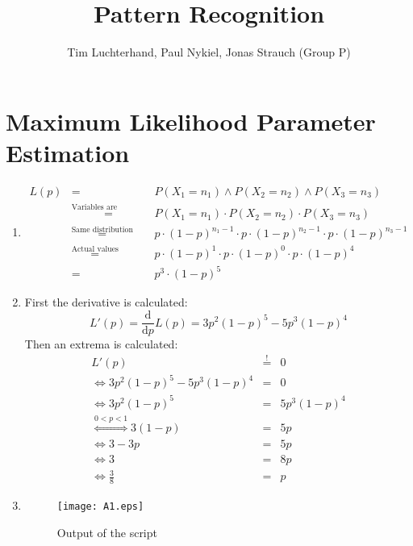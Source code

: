 \documentclass[DIN, pagenumber=false, fontsize=11pt, parskip=half]{scrartcl}
\title{Pattern Recognition}
\author{Tim Luchterhand, Paul Nykiel, Jonas Strauch (Group P)}
\begin{document}
    \maketitle
    \section{Maximum Likelihood Parameter Estimation}
    \begin{enumerate}
        \item
            \begin{eqnarray*}
                L(p) &=& P({X_1 = n_1}) \land P({X_2 = n_2}) \land P({X_3 = n_3}) \\
                &\stackrel{\text{Variables are independent}}{=}& P({X_1 = n_1}) \cdot P({X_2 = n_2}) \cdot P({X_3 = n_3}) \\
                &\stackrel{\text{Same distribution}}{=}& p \cdot {(1-p)}^{n_1 - 1} \cdot p \cdot {(1-p)}^{n_2 - 1} \cdot p \cdot {(1-p)}^{n_3 - 1} \\
                &\stackrel{\text{Actual values}}{=}& p \cdot {(1-p)}^{1} \cdot p \cdot {(1-p)}^{0} \cdot p \cdot {(1-p)}^{4} \\
                &=& p^3 \cdot {(1-p)}^5
            \end{eqnarray*}
        \item
            First the derivative is calculated:
            \begin{equation*}
                L'(p) = \frac{\text{d}}{\text{d}p} L(p) = 3 p^2 {(1-p)}^5 - 5 p^3 {(1-p)}^4
            \end{equation*}
            Then an extrema is calculated:
            \begin{eqnarray*}
                L'(p) &\stackrel{!}{=}& 0 \\
                \Leftrightarrow 3 p^2 {(1-p)}^5 - 5 p^3 {(1-p)}^4 &=& 0 \\
                \Leftrightarrow 3 p^2 {(1-p)}^5 &=& 5 p^3 {(1-p)}^4 \\
                \stackrel{0 < p < 1}{\Leftrightarrow} 3 (1-p) &=& 5 p \\
                \Leftrightarrow 3 - 3p &=& 5p \\
                \Leftrightarrow 3 &=& 8p \\
                \Leftrightarrow \frac{3}{8} &=& p
            \end{eqnarray*}
        \item
            
            \begin{figure}[H]
                \texttt{[image: A1.eps]}
                \caption{Output of the script}
            \end{figure}
    \end{enumerate}
\end{document}
